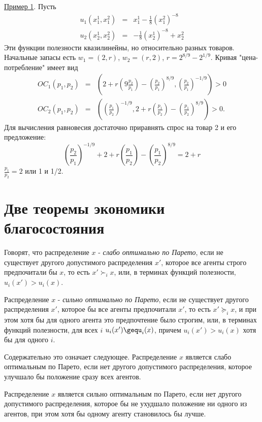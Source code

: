 \underline{Пример 1}. Пусть
\begin{eqnarray*}
u_1(x^1_1,x^2_1)&=&x^1_1-{\frac{1}{8}}(x^2_1)^{-8}\\
u_2(x^1_2,x^2_2)&=&-{\frac{1}{8}}(x^1_2)^{-8}+x^2_2
\end{eqnarray*}
Эти функции полезности квазилинейны, но относительно разных товаров. Начальные запасы
есть $w_1=(2,r)$, $w_2=(r,2)$, $r=2^{8/9}-2^{1/9}$. Кривая "цена-потребление" имеет вид
\begin{eqnarray*}
OC_1(p_1,p_2)&=&\left( 2+r\left( 9{\frac{p_2}{p_1}}\right
)-\left(\frac{p_2}{p_1}\right )^{8/9},
\left ({\frac{p_2}{p_1}}\right )^{-1/9}\right )>0\\
OC_2(p_1,p_2)&=&\left (\left ({\frac{p_1}{p_2}}\right
)^{-1/9},2+r\left ({\frac{p_1}{p_2}}\right )- \left
({\frac{p_1}{p_2}}\right )^{8/9}\right )>0.
\end{eqnarray*}
Для вычисления равновесия достаточно приравнять спрос на товар 2 и его предложение:
$$
\left ({\frac{p_2}{p_1}}\right )^{-1/9}+2+r\left
({\frac{p_1}{p_2}}\right )-\left ( {\frac{p_1}{p_2}}\right
)^{8/9}=2+r
$$
${\frac{p_1}{p_2}}=2$  или 1 и 1/2.

\section*{Две теоремы экономики благосостояния}

Говорят, что распределение $x$ - \emph{слабо  оптимально по Парето}, если
не существует другого допустимого распределения $x'$, которое все агенты
строго предпочитали бы $x$, то есть $x'\succ_i x$, или, в терминах
функций полезности, $u_i(x')>u_i(x)$.

Распределение $x$ - \emph{сильно оптимально по Парето}, если не существует
другого распределения $x'$, которое бы все агенты предпочитали $x'$,
то есть $x'\succcurlyeq_i x$, и при этом хотя бы для одного агента это
предпочтение было строгим, или, в терминах функций полезности,
для всех $i$ $u_i(x')\gequ_i(x)$, причем $u_i(x')>u_i(x)$ хотя бы для
одного $i$.

Содержательно это означает следующее. Распределение $x$ является
слабо оптимальным по Парето, если нет другого допустимого распределения,
которое улучшало бы положение сразу всех агентов.

Распределение $x$ является сильно оптимальным по Парето, если нет другого
допустимого распределения, которое бы не ухудшало положение ни одного из агентов,
при этом хотя бы одному агенту становилось бы лучше.

